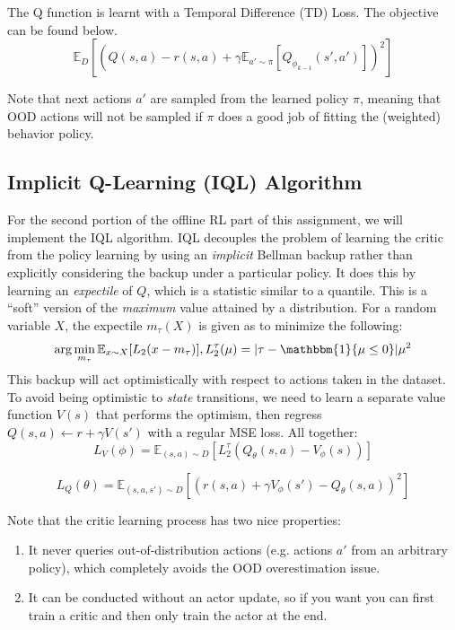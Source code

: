 \documentclass{article}
\begin{document}
The Q function is learnt with a Temporal Difference (TD) Loss. The objective can be found below.
\begin{equation}
    \mathbb{E}_{D}[(Q(s,a) - r(s,a) + \gamma\mathbb{E}_{a' \sim \pi}[Q_{\phi_{k-1}}(s',a')])^2]
\end{equation}

Note that next actions $a'$ are sampled from the learned policy $\pi$, meaning that OOD actions will not be sampled if $\pi$ does a good job of fitting the (weighted) behavior policy.

\subsection{Implicit Q-Learning (IQL) Algorithm}

For the second portion of the offline RL part of this assignment, we will implement the IQL algorithm. IQL decouples the problem of learning the critic from the policy learning by using an \textit{implicit} Bellman backup rather than explicitly considering the backup under a particular policy. It does this by learning an \textit{expectile} of $Q$, which is a statistic similar to a quantile. This is a ``soft'' version of the \textit{maximum} value attained by a distribution. For a random variable $X$, the expectile $m_\tau(X)$ is given as to minimize the following:
\[\arg \min_{m_\tau} \mathbb{E}_{x \sim X}[L_2(x - m_\tau)], L_2^\tau(\mu) = |\tau - \mathbbm{1}\{ \mu \le 0 \} |\mu^2\]
This backup will act optimistically with respect to actions taken in the dataset. To avoid being optimistic to \textit{state} transitions, we need to learn a separate value function $V(s)$ that performs the optimism, then regress $Q(s, a) \gets r + \gamma V(s')$ with a regular MSE loss. All together:
\begin{equation}
    L_V(\phi) =  \mathbb{E}_{(s,a) \sim D}[L_2^\tau(Q_\theta(s,a) - V_\phi(s))]
\end{equation}

\begin{equation}
    L_Q(\theta) =  \mathbb{E}_{(s,a,s') \sim D}[(r(s,a) + \gamma V_\phi(s') - Q_\theta(s,a))^2]
\end{equation}

Note that the critic learning process has two nice properties:
\begin{enumerate}
    \item It never queries out-of-distribution actions (e.g. actions $a'$ from an arbitrary policy), which completely avoids the OOD overestimation issue.
    \item It can be conducted without an actor update, so if you want you can first train a critic and then only train the actor at the end.
\end{enumerate}
\end{document}
